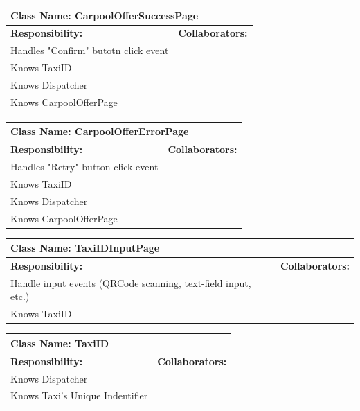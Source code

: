 \documentclass[]{article}
\begin{document}
	\begin{table}[H]
	\centering
	\begin{tabular}{|p{6cm}|p{6cm}|}
	\hline 
		\multicolumn{2}{|l|}{\textbf{Class Name: CarpoolOfferSuccessPage}} \\
	\hline
	\textbf{Responsibility:} & \textbf{Collaborators:} \\
	\hline
	Handles "Confirm" butotn click event  & \\ \hline 
	Knows TaxiID &\\ \hline
	Knows Dispatcher &\\ \hline
	Knows CarpoolOfferPage &\\ \hline
	\end{tabular}
	\end{table}

	\begin{table}[H]
	\centering
	\begin{tabular}{|p{6cm}|p{6cm}|}
	\hline 
		\multicolumn{2}{|l|}{\textbf{Class Name: CarpoolOfferErrorPage}} \\
	\hline
	\textbf{Responsibility:} & \textbf{Collaborators:} \\
	\hline
	Handles "Retry" button click event  & \\ \hline 
	Knows TaxiID &\\ \hline
	Knows Dispatcher &\\ \hline
	Knows CarpoolOfferPage &\\ \hline
	\end{tabular}
	\end{table}

	\begin{table}[H]
	\centering
	\begin{tabular}{|p{6cm}|p{6cm}|}
	\hline 
		\multicolumn{2}{|l|}{\textbf{Class Name: TaxiIDInputPage}} \\
	\hline
	\textbf{Responsibility:} & \textbf{Collaborators:} \\
	\hline
	Handle input events (QRCode scanning, text-field input, etc.) &\\ \hline
	Knows TaxiID&  \\ \hline
	\end{tabular}
	\end{table}

	\begin{table}[H]
	\centering
	\begin{tabular}{|p{6cm}|p{6cm}|}
	\hline 
		\multicolumn{2}{|l|}{\textbf{Class Name: TaxiID}} \\
	\hline
	\textbf{Responsibility:} & \textbf{Collaborators:} \\
	\hline
	Knows Dispatcher&  \\ \hline
	Knows Taxi's Unique Indentifier&  \\ \hline
	\end{tabular}
	\end{table}
\end{document}
